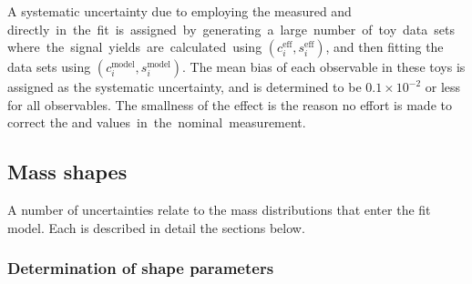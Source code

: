 A systematic uncertainty due to employing the measured \ci and \si directly in the fit is assigned by generating a large number of toy data sets where the signal yields are calculated using $(c_i^\text{eff}, s_i^\text{eff})$, and then fitting the data sets using $(c_i^\text{model}, s_i^\text{model})$. The mean bias of each observable in these toys is assigned as the systematic uncertainty, and is determined to be $0.1\times 10^{-2}$ or less for all observables. The smallness of the effect is the reason no effort is made to correct the \ci and \si values in the nominal measurement.








\subsection{Mass shapes} %
\label{sub:systematics_from_mass_shapes}


A number of uncertainties relate to the mass distributions that enter the fit model. Each is described in detail the sections below.

\subsubsection{Determination of shape parameters} %
\label{ssub:determination_of_shape_parameters}

